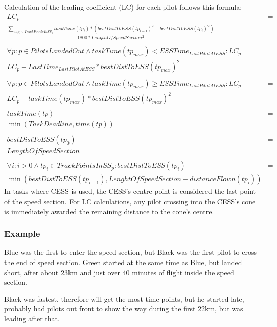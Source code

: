 \documentclass{article}
\begin{document}
Calculation of the leading coefficient (LC) for each pilot follows this
formula:
\begin{align*}
    LC_p &= \\
    \frac{\sum_{i : tp_i \in TrackPointsInSS_p} taskTime(tp_i) * (bestDistToESS(tp_{i - 1})^2 - bestDistToESS(tp_i)^2)}{1800 * LengthOfSpeedSection^2} \\
    \\
    \forall p : p \in PilotsLandedOut \land taskTime(tp_{max}) < ESSTime_{LastPilotAtESS} : LC_p &= \\
    LC_p + LastTime_{LastPilotAtESS} * bestDistToESS(tp_{max})^2 \\
    \\
    \forall p : p \in PilotsLandedOut \land taskTime(tp_{max}) \geq ESSTime_{LastPilotAtESS} : LC_p &= \\
    LC_p + taskTime(tp_{max}) * bestDistToESS(tp_{max})^2 \\
    \\
    taskTime(tp) &= \\
    \min(TaskDeadline, time(tp)) \\
    \\
    bestDistToESS(tp_0) &= \\
    LengthOfSpeedSection \\
    \\
    \forall i : i > 0 \land tp_i \in TrackPointsInSS_p : bestDistToESS(tp_i) &= \\
    \min(bestDistToESS(tp_{i - 1}), LenghtOfSpeedSection - distanceFlown(tp_i))
\end{align*}
In tasks where CESS is used, the CESS’s centre point is considered the last
point of the speed section. For LC calculations, any pilot crossing into the
CESS’s cone is immediately awarded the remaining distance to the cone’s centre.

\subsubsection{Example}
Blue was the first to enter the speed section, but Black was the first pilot to
cross the end of speed section. Green started at the same time as Blue, but
landed short, after about 23km and just over 40 minutes of flight inside the
speed section.

Black was fastest, therefore will get the most time points, but he started
late, probably had pilots out front to show the way during the first 22km, but
was leading after that.
\end{document}
